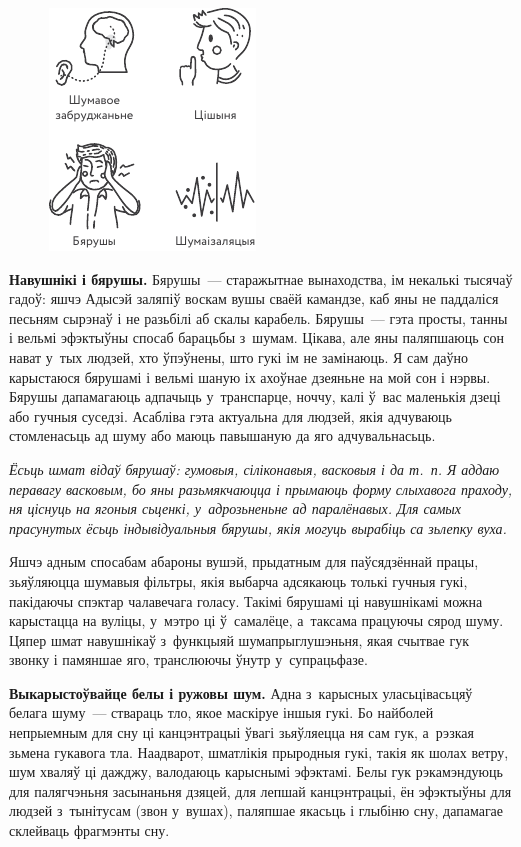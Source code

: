 \begin{figure}[htb!]
  \centering
  \includegraphics[scale=1.5]{willpower/ch11/7.pdf}
\end{figure}

\textbf{Навушнікі і бярушы.} Бярушы~--- старажытнае вынаходства, ім некалькі тысячаў гадоў: яшчэ Адысэй заляпіў воскам вушы сваёй камандзе, каб яны не паддаліся песьням сырэнаў і не разьбілі аб скалы карабель. Бярушы~--- гэта просты, танны і вельмі эфэктыўны спосаб барацьбы з~шумам. Цікава, але яны паляпшаюць сон нават у~тых людзей, хто ўпэўнены, што гукі ім не замінаюць. Я сам даўно карыстаюся бярушамі і вельмі шаную іх ахоўнае дзеяньне на мой сон і нэрвы. Бярушы дапамагаюць адпачыць у~транспарце, ноччу, калі ў~вас маленькія дзеці або гучныя суседзі. Асабліва гэта актуальна для людзей, якія адчуваюць стомленасьць ад шуму або маюць павышаную да яго адчувальнасьць.

\emph{Ёсьць шмат відаў бярушаў: гумовыя, сіліконавыя, васковыя і да т.~п. Я аддаю перавагу васковым, бо яны разьмякчаюцца і прымаюць форму слыхавога праходу, ня ціснуць на ягоныя сьценкі, у~адрозьненьне ад паралёнавых. Для самых прасунутых ёсьць індывідуальныя бярушы, якія могуць вырабіць са зьлепку вуха.}

Яшчэ адным спосабам абароны вушэй, прыдатным для паўсядзённай працы, зьяўляюцца шумавыя фільтры, якія выбарча адсякаюць толькі гучныя гукі, пакідаючы спэктар чалавечага голасу. Такімі бярушамі ці навушнікамі можна карыстацца на вуліцы, у~мэтро ці ў~самалёце, а~таксама працуючы сярод шуму. Цяпер шмат навушнікаў з~функцыяй шумапрыглушэньня, якая счытвае гук звонку і памяншае яго, транслюючы ўнутр у~супрацьфазе.

\textbf{Выкарыстоўвайце белы і ружовы шум.} Адна з~карысных уласьцівасьцяў белага шуму~--- ствараць тло, якое маскіруе іншыя гукі. Бо найболей непрыемным для сну ці канцэнтрацыі ўвагі зьяўляецца ня сам гук, а~рэзкая зьмена гукавога тла. Наадварот, шматлікія прыродныя гукі, такія як шолах ветру, шум хваляў ці дажджу, валодаюць карыснымі эфэктамі. Белы гук рэкамэндуюць для палягчэньня засынаньня дзяцей, для лепшай канцэнтрацыі, ён эфэктыўны для людзей з~тынітусам (звон у~вушах), паляпшае якасьць і глыбіню сну, дапамагае склейваць фрагмэнты сну.

